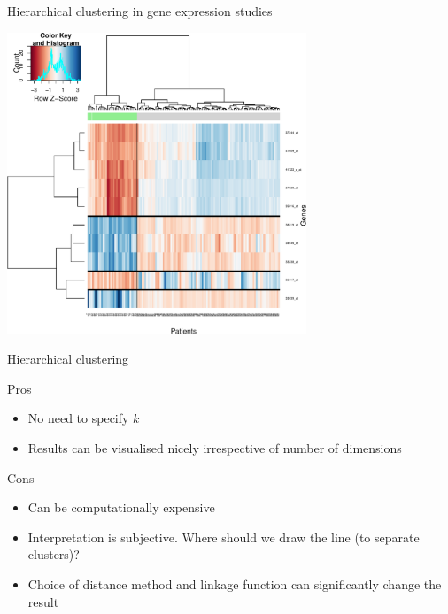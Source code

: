 \documentclass[pdf]{beamer}
\begin{document}
\begin{frame}{Hierarchical clustering in gene expression studies}
\begin{center}
	\includegraphics[width=0.67\textwidth]{geneExpression.pdf}
\end{center}
\end{frame}
\begin{frame}{Hierarchical clustering}
\begin{exampleblock}{Pros}
\begin{itemize}
	\item No need to specify $k$
	\item Results can be visualised nicely irrespective of number of dimensions 
\end{itemize}
\end{exampleblock}
\vfill
\begin{alertblock}{Cons}
\begin{itemize}
	\item Can be computationally expensive
	\item Interpretation is subjective. Where should we draw the line (to separate clusters)?
	\item Choice of distance method and linkage function can significantly change the result 
\end{itemize}
\end{alertblock}
\end{frame}
\end{document}
